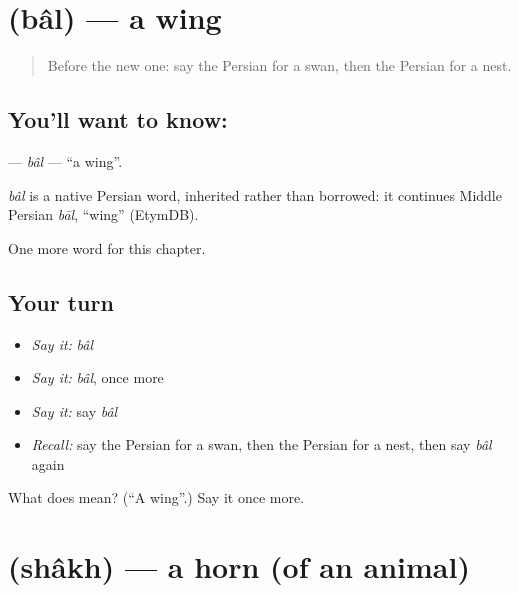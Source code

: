 \section[\texorpdfstring{\fa{بال} (bâl)}{بال (bâl)}]{ (bâl) — a wing}

\label{lesson:FA-C245-bal}



\begin{quote}
Before the new one: say the Persian for a swan, then the Persian for a nest.
\end{quote}

\subsection*{You'll want to know: }
\textbf{} — \emph{bâl} — \textquotedblleft{}a wing\textquotedblright{}.

\begin{cousinweb}
\emph{bâl} is a native Persian word, inherited rather than borrowed: it continues Middle Persian \emph{bāl}, \textquotedblleft{}wing\textquotedblright{} (EtymDB).
\end{cousinweb}

\begin{grammarlens}[title={What you've built}]
One more word for this chapter.
\end{grammarlens}

\subsection*{Your turn}
\begin{itemize}
\raggedright
  \item \emph{Say it:} \emph{bâl}
  \item \emph{Say it:} \emph{bâl}, once more
  \item \emph{Say it:} say \emph{bâl}
  \item \emph{Recall:} say the Persian for a swan, then the Persian for a nest, then say \emph{bâl} again
\end{itemize}

\begin{tcolorbox}[breakable,colback=teal!4,colframe=teal!35!black,title={Before you move on}]
What does  mean? (\textquotedblleft{}A wing\textquotedblright{}.) Say it once more.
\end{tcolorbox}
\section[\texorpdfstring{\fa{شاخ} (shâkh)}{شاخ (shâkh)}]{ (shâkh) — a horn (of an animal)}


